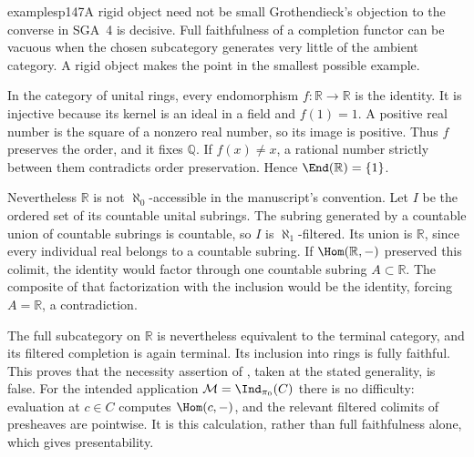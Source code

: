 \begin{dcomment}{examples}{p147}{A rigid object need not be small}
Grothendieck's objection to the converse in SGA~4 is decisive. Full faithfulness of a completion functor can be vacuous when the chosen subcategory generates very little of the ambient category. A rigid object makes the point in the smallest possible example.

In the category of unital rings, every endomorphism $f:\mathbb R\to\mathbb R$ is the identity. It is injective because its kernel is an ideal in a field and $f(1)=1$. A positive real number is the square of a nonzero real number, so its image is positive. Thus $f$ preserves the order, and it fixes $\mathbb Q$. If $f(x)\neq x$, a rational number strictly between them contradicts order preservation. Hence $\End(\mathbb R)=\{1\}$.

Nevertheless $\mathbb R$ is not $\aleph_0$-accessible in the manuscript's convention. Let $I$ be the ordered set of its countable unital subrings. The subring generated by a countable union of countable subrings is countable, so $I$ is $\aleph_1$-filtered. Its union is $\mathbb R$, since every individual real belongs to a countable subring. If $\Hom(\mathbb R,-)$ preserved this colimit, the identity would factor through one countable subring $A\subset\mathbb R$. The composite of that factorization with the inclusion would be the identity, forcing $A=\mathbb R$, a contradiction.

The full subcategory on $\mathbb R$ is nevertheless equivalent to the terminal category, and its filtered completion is again terminal. Its inclusion into rings is fully faithful. This proves that the necessity assertion of \citet[Expos\'e~I, Corollary~9.18(a)]{SGA4I1972}, taken at the stated generality, is false. For the intended application $\mathcal M=\Ind_{\pi_0}(C)$ there is no difficulty: evaluation at $c\in C$ computes $\Hom(c,-)$, and the relevant filtered colimits of presheaves are pointwise. It is this calculation, rather than full faithfulness alone, which gives presentability.
\end{dcomment}

